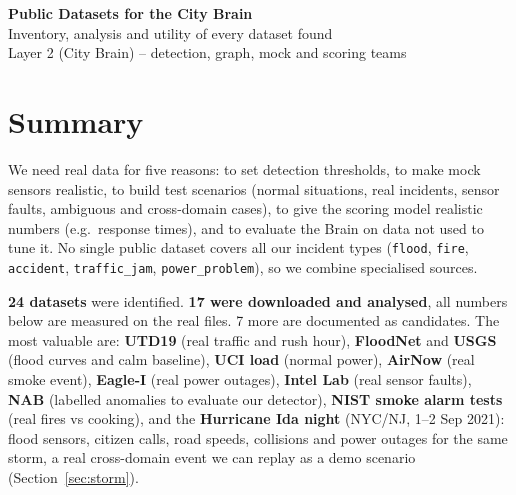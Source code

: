\documentclass[10pt,a4paper]{article}
\newcommand{\code}[1]{\texttt{#1}}
\begin{document}
\begin{center}
{\LARGE\bfseries\color{brand} Public Datasets for the City Brain}\\[4pt]
{\large Inventory, analysis and utility of every dataset found}\\[2pt]
{\small Layer 2 (City Brain) -- detection, graph, mock and scoring teams}
\end{center}
\vspace{2mm}

\section*{Summary}

We need real data for five reasons: to set detection thresholds, to make mock sensors realistic, to build test scenarios (normal situations, real incidents, sensor faults, ambiguous and cross-domain cases), to give the scoring model realistic numbers (e.g.\ response times), and to evaluate the Brain on data not used to tune it. No single public dataset covers all our incident types (\code{flood}, \code{fire}, \code{accident}, \code{traffic\_jam}, \code{power\_problem}), so we combine specialised sources.

\textbf{24 datasets} were identified. \textbf{17 were downloaded and analysed}, all numbers below are measured on the real files. 7 more are documented as candidates. The most valuable are: \textbf{UTD19} (real traffic and rush hour), \textbf{FloodNet} and \textbf{USGS} (flood curves and calm baseline), \textbf{UCI load} (normal power), \textbf{AirNow} (real smoke event), \textbf{Eagle-I} (real power outages), \textbf{Intel Lab} (real sensor faults), \textbf{NAB} (labelled anomalies to evaluate our detector), \textbf{NIST smoke alarm tests} (real fires vs cooking), and the \textbf{Hurricane Ida night} (NYC/NJ, 1--2 Sep 2021): flood sensors, citizen calls, road speeds, collisions and power outages for the same storm, a real cross-domain event we can replay as a demo scenario (Section~\ref{sec:storm}).
\end{document}
